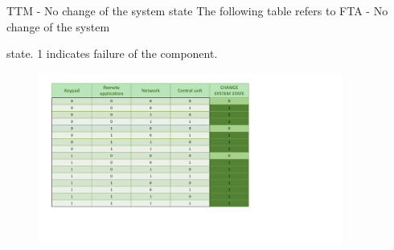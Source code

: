 \begin{frame}{TTM - No change of the system state}
  \vskip 0.3cm
    The following table refers to FTA - No change of the system

    state. 1 indicates failure of the component.
    \vskip 0.05cm
    \begin{figure}[ht!]
      \includegraphics[width=100mm]{images/ttm_no_change_of_the_system_state.pdf}
      \label{fig:ttm_no_change_of_the_system_state}
    \end{figure}
\end{frame}
